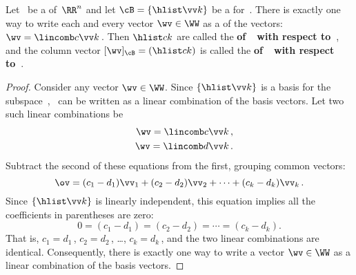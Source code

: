 \begin{theorem} \label{thm:ssbc} 
Let \WW\ be a  of~\(\RR^n\)  and let \(\cB=\{\hlist\vv k\}\) be a  for~\WW.  
There is exactly one way to write each and every vector \(\wv\in\WW\) as a  of the  vectors: \(\wv=\lincomb c\vv k\)\,.
Then \(\hlist ck\) are called the \textbf{ of~\wv\ with respect to~\cB}, and the column vector \([\wv]_{\cB}=(\hlist ck)\) is called the \textbf{ of~\wv\ with respect to~\cB}.
\end{theorem}
\begin{proof}  
Consider any vector \(\wv\in\WW\).
Since \(\{\hlist\vv k\}\) is a basis for the subspace~\WW, \wv~can be written as a linear combination of the basis vectors. 
Let two such linear combinations be
\begin{eqnarray*}&&
\wv=\lincomb c\vv k\,,
\\&&
\wv=\lincomb d\vv k\,.
\end{eqnarray*}
Subtract the second of these equations from the first, grouping common vectors:
\begin{equation*}
\ov=(c_1-d_1)\vv_1+(c_2-d_2)\vv_2+\cdots+(c_k-d_k)\vv_k\,.
\end{equation*}
Since \(\{\hlist\vv k\}\) is linearly independent, this equation implies all the coefficients in parentheses are zero:
\begin{equation*}
0=(c_1-d_1)=(c_2-d_2)=\cdots=(c_k-d_k).
\end{equation*}
That is, \(c_1=d_1\)\,, \(c_2=d_2\)\,, \ldots, \(c_k=d_k\)\,, and the two linear combinations are identical.
Consequently, there is exactly one way to write a vector \(\wv\in\WW\) as a {linear combination} of the {basis} vectors.
\end{proof}


